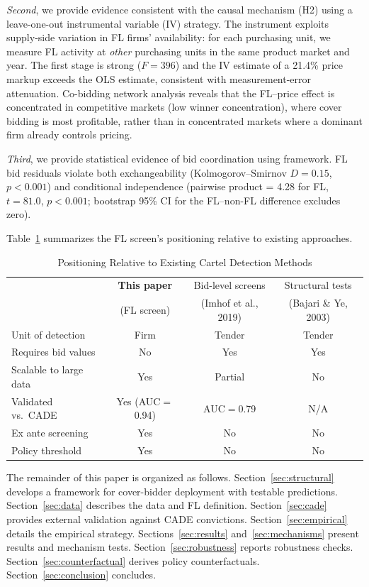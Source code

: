 \emph{Second}, we provide evidence consistent with the causal mechanism
(H2) using a leave-one-out instrumental variable (IV) strategy. The
instrument exploits supply-side variation in FL firms' availability: for
each purchasing unit, we measure FL activity at \emph{other} purchasing
units in the same product market and year. The first stage is strong
($F = 396$) and the IV estimate of a 21.4\% price markup exceeds the OLS %
estimate, consistent with measurement-error attenuation. Co-bidding
network analysis reveals that the FL--price effect is concentrated in
competitive markets (low winner concentration), where cover bidding is
most profitable, rather than in concentrated markets where a dominant
firm already controls pricing.

\emph{Third}, we provide statistical evidence of bid coordination using
\cites{bajari2003deciding} framework. FL bid residuals violate both
exchangeability (Kolmogorov--Smirnov $D = 0.15$, $p < 0.001$) and
conditional independence (pairwise product = 4.28 for FL, $t = 81.0$, %
$p < 0.001$; bootstrap 95\% CI for the FL--non-FL difference excludes
zero).

Table~\ref{tab:contributions} summarizes the FL screen's positioning
relative to existing approaches.

\begin{table}[htbp]
\centering
\small
\caption{Positioning Relative to Existing Cartel Detection Methods}
\label{tab:contributions}
\begin{tabular}{lccc}
\toprule
 & \textbf{This paper} & Bid-level screens & Structural tests \\
 & (FL screen) & (Imhof et al., 2019) & (Bajari \& Ye, 2003) \\
\midrule
Unit of detection & Firm & Tender & Tender \\
Requires bid values & No & Yes & Yes \\
Scalable to large data & Yes & Partial & No \\
Validated vs.\ CADE & Yes (AUC$=$0.94) & AUC$=$0.79 & N/A \\
Ex ante screening & Yes & No & No \\
Policy threshold & Yes & No & No \\
\bottomrule
\end{tabular}
\end{table}

The remainder of this paper is organized as follows.
Section~\ref{sec:structural} develops a framework for cover-bidder
deployment with testable predictions. Section~\ref{sec:data} describes
the data and FL definition. Section~\ref{sec:cade} provides external
validation against CADE convictions. Section~\ref{sec:empirical} details
the empirical strategy. Sections~\ref{sec:results}
and~\ref{sec:mechanisms} present results and mechanism tests.
Section~\ref{sec:robustness} reports robustness checks.
Section~\ref{sec:counterfactual} derives policy counterfactuals. %
Section~\ref{sec:conclusion} concludes.
